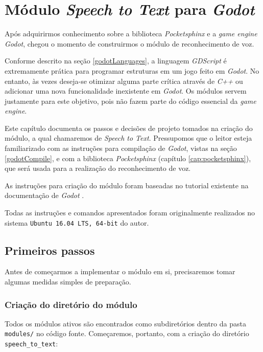 \chapter{Módulo \textit{Speech to Text} para \textit{Godot}}
\label{cap:stt-module}

Após adquirirmos conhecimento sobre a biblioteca \textit{Pocketsphinx} e a \textit{game engine} \textit{Godot}, chegou o momento de construirmos o módulo de reconhecimento de voz.

Conforme descrito na seção \ref{godotLanguages}, a linguagem \mbox{\textit{GDScript}} é extremamente prática para programar estruturas em um jogo feito em \textit{Godot}. No entanto, às vezes deseja-se otimizar alguma parte crítica através de \textit{C++} ou adicionar uma nova funcionalidade inexistente em \textit{Godot}. Os módulos servem justamente para este objetivo, pois não fazem parte do código essencial da \textit{game engine}.

Este capítulo documenta os passos e decisões de projeto tomados na criação do módulo, a qual chamaremos de \textit{Speech to Text}. Pressupomos que o leitor esteja familiarizado com as instruções para compilação de \textit{Godot}, vistas na seção \ref{godotCompile}, e com a biblioteca \textit{Pocketsphinx} (capítulo \ref{cap:pocketsphinx}), que será usada para a realização do reconhecimento de voz.

As instruções para criação do módulo foram baseadas no tutorial existente na documentação de \textit{Godot} \citep{godotModuleCreation}.

Todas as instruções e comandos apresentados foram originalmente realizados no sistema \texttt{Ubuntu 16.04 LTS, 64-bit} do autor.


\section{Primeiros passos}

Antes de começarmos a implementar o módulo em si, precisaremos tomar algumas medidas simples de preparação.

\subsection{Criação do diretório do módulo}

Todos os módulos ativos são encontrados como subdiretórios dentro da pasta \texttt{modules/} no código fonte. Começaremos, portanto, com a criação do diretório \texttt{speech\_to\_text}:

